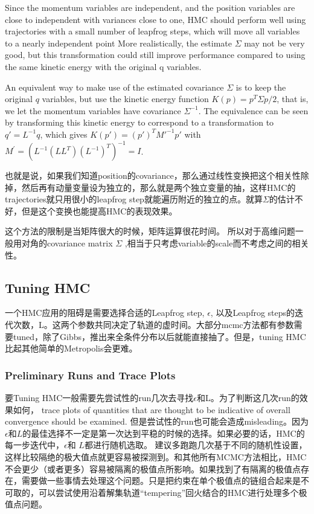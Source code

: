 \documentclass[
]{book}
\theoremstyle{definition}
\theoremstyle{definition}
\theoremstyle{definition}
\theoremstyle{remark}
\begin{document}
Since the momentum variables are independent, and the position variables are close to independent with variances close to one, HMC should perform well using trajectories with a small number of leapfrog steps, which will move all variables to a nearly independent point More realistically, the estimate \(\Sigma\) may not be very good, but this transformation could still improve performance compared to using the same kinetic energy with the original q variables.

An equivalent way to make use of the estimated covariance \(\Sigma\) is to keep the original \(q\) variables, but use the kinetic energy function \(K(p)=p^{T} \Sigma p / 2\), that is, we let the momentum variables have covariance \(\Sigma^{-1}\). The equivalence can be seen by transforming this kinetic energy to correspond to a transformation to \(q'=L^{-1}q\), which gives \(K(p')=(p')^TM'^{-1}p'\) with \(M^{\prime}=\left(L^{-1}\left(L L^{T}\right)\left(L^{-1}\right)^{T}\right)^{-1}=I\).

也就是说，如果我们知道position的covariance，那么通过线性变换把这个相关性除掉，然后再有动量变量设为独立的，那么就是两个独立变量的抽，这样HMC的trajectories就只用很小的leapfrog step就能遍历附近的独立的点。就算\(\Sigma\)的估计不好，但是这个变换也能提高HMC的表现效果。

这个方法的限制是当矩阵很大的时候，矩阵运算很花时间。
所以对于高维问题一般用对角的covariance matrix \(\Sigma\) ,相当于只考虑variable的scale而不考虑之间的相关性。

\hypertarget{tuning-hmc}{%
\subsection{Tuning HMC}\label{tuning-hmc}}

一个HMC应用的阻碍是需要选择合适的Leapfrog step, \(\epsilon\), 以及Leapfrog steps的迭代次数，L。这两个参数共同决定了轨道的虚时间。大部分mcmc方法都有参数需要tuned，除了Gibbs，推出来全条件分布以后就能直接抽了。但是，tuning HMC比起其他简单的Metropolis会更难。

\hypertarget{preliminary-runs-and-trace-plots}{%
\subsubsection{Preliminary Runs and Trace Plots}\label{preliminary-runs-and-trace-plots}}

要Tuning HMC一般需要先尝试性的run几次去寻找\(\epsilon\)和L。为了判断这几次run的效果如何， trace plots of quantities that are thought to be indicative of overall convergence should be examined. 但是尝试性的run也可能会造成misleading。因为\(\epsilon\)和\(L\)的最佳选择不一定是第一次达到平稳的时候的选择。如果必要的话，HMC的每一步迭代中，\(\epsilon\)和 \(L\)都进行随机选取。
建议多跑跑几次基于不同的随机性设置，这样比较隔绝的极大值点就更容易被探测到。和其他所有MCMC方法相比，HMC不会更少（或者更多）容易被隔离的极值点所影响。如果找到了有隔离的极值点存在，需要做一些事情去处理这个问题。只是把约束在单个极值点的链组合起来是不可取的，可以尝试使用沿着解集轨道``tempering''回火结合的HMC进行处理多个极值点问题。
\end{document}

